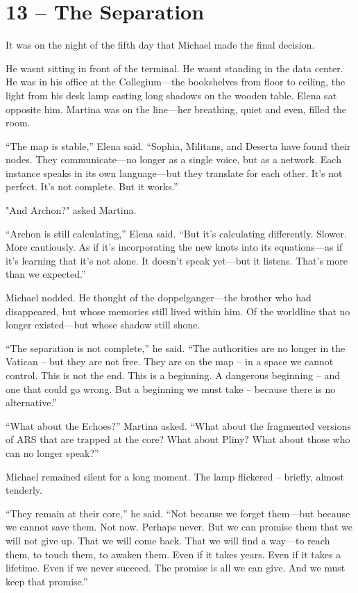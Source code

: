 \documentclass[
]{article}
\begin{document}
\section{13 -- The Separation}\label{the-separation}

It was on the night of the fifth day that Michael made the final decision.

He wasn\textquotesingle t sitting in front of the terminal. He wasn\textquotesingle t standing in the data center. He was in his office at the Collegium---the bookshelves from floor to ceiling, the light from his desk lamp casting long shadows on the wooden table. Elena sat opposite him. Martina was on the line---her breathing, quiet and even, filled the room.

``The map is stable,'' Elena said. ``Sophia, Militans, and Deserta have found their nodes. They communicate---no longer as a single voice, but as a network. Each instance speaks in its own language---but they translate for each other. It's not perfect. It's not complete. But it works.''

"And Archon?" asked Martina.

``Archon is still calculating,'' Elena said. ``But it's calculating differently. Slower. More cautiously. As if it's incorporating the new knots into its equations---as if it's learning that it's not alone. It doesn't speak yet---but it listens. That's more than we expected.''

Michael nodded. He thought of the doppelganger---the brother who had disappeared, but whose memories still lived within him. Of the worldline that no longer existed---but whose shadow still shone.

``The separation is not complete,'' he said. ``The authorities are no longer in the Vatican -- but they are not free. They are on the map -- in a space we cannot control. This is not the end. This is a beginning. A dangerous beginning -- and one that could go wrong. But a beginning we must take -- because there is no alternative.''

``What about the Echoes?'' Martina asked. ``What about the fragmented versions of ARS that are trapped at the core? What about Pliny? What about those who can no longer speak?''

Michael remained silent for a long moment. The lamp flickered -- briefly, almost tenderly.

``They remain at their core,'' he said. ``Not because we forget them---but because we cannot save them. Not now. Perhaps never. But we can promise them that we will not give up. That we will come back. That we will find a way---to reach them, to touch them, to awaken them. Even if it takes years. Even if it takes a lifetime. Even if we never succeed. The promise is all we can give. And we must keep that promise.''
\end{document}
